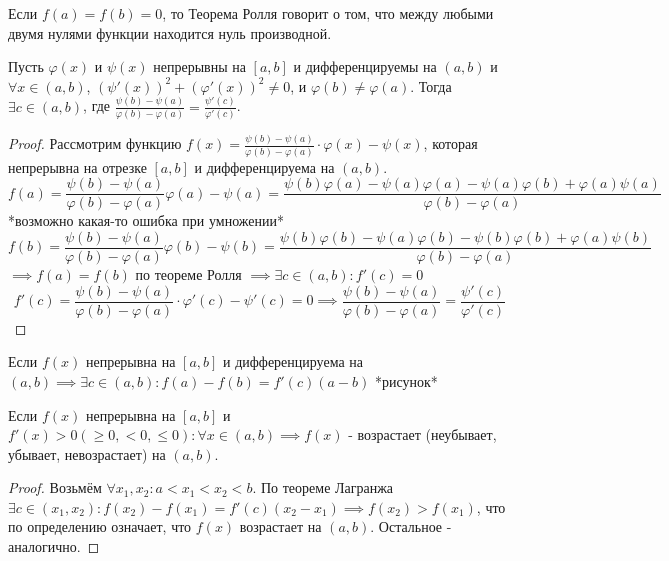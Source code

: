     Если $f(a) = f(b) = 0$, то Теорема Ролля говорит о том, что между любыми двумя нулями функции находится нуль производной.
\begin{theorem}
        Пусть $\varphi(x)$ и $\psi(x)$ непрерывны на $[a, b]$ и дифференцируемы на $(a, b)$ и $\forall x \in (a, b)$, $(\psi'(x))^2+(\varphi'(x))^2 \neq 0$, и $\varphi(b) \neq \varphi(a)$.
        Тогда $\exists c \in (a, b)$, где $\frac{\psi(b) - \psi(a)}{\varphi(b) - \varphi(a)} = \frac{\psi'(c)}{\varphi'(c)}$.
\end{theorem}
\begin{proof}
        Рассмотрим функцию $f(x) = \frac{\psi(b) - \psi(a)}{\varphi(b) - \varphi(a)} \cdot \varphi(x) - \psi(x)$, которая непрерывна на отрезке $[a, b]$ и дифференцируема на $(a, b)$.
        \[f(a)=\frac{\psi(b) - \psi(a)}{\varphi(b) - \varphi(a)}\varphi(a)-\psi(a) = \frac{\psi(b)\varphi(a)-\psi(a)\varphi(a)-\psi(a)\varphi(b)+\varphi(a)\psi(a)}{\varphi(b) - \varphi(a)}\] *возможно какая-то ошибка при умножении*
        \[f(b)=\frac{\psi(b) - \psi(a)}{\varphi(b) - \varphi(a)}\varphi(b)-\psi(b) = \frac{\psi(b)\varphi(b)-\psi(a)\varphi(b)-\psi(b)\varphi(b)+\varphi(a)\psi(b)}{\varphi(b) - \varphi(a)}\]
        $\implies f(a)=f(b)$ по теореме Ролля $\implies \exists c \in (a, b): f'(c) = 0$
        \[f'(c) = \frac{\psi(b)-\psi(a)}{\varphi(b)-\varphi(a)} \cdot \varphi'(c)-\psi'(c) = 0 \implies \frac{\psi(b)-\psi(a)}{\varphi(b)-\varphi(a)} = \frac{\psi'(c)}{\varphi'(c)}\]
\end{proof}

\begin{theorem}
        Если $f(x)$ непрерывна на $[a, b]$ и дифференцируема на $(a, b) \implies \exists c \in (a, b): f(a)-f(b)=f'(c)(a-b)$ *рисунок*
\end{theorem}

\begin{theorem}
    Если $f(x)$ непрерывна на $[a, b]$ и $f'(x)>0 (\geq 0, <0, \leq 0): \forall x \in (a, b) \implies f(x)$ - возрастает (неубывает, убывает, невозрастает) на $(a, b)$.
\end{theorem}
\begin{proof}
    Возьмём $\forall x_1, x_2: a < x_1 < x_2 < b$. По теореме Лагранжа $\exists c \in (x_1, x_2): f(x_2) - f(x_1) = f'(c)(x_2-x_1) \implies f(x_2) > f(x_1)$, что по определению означает, что $f(x)$ возрастает на $(a, b)$. Остальное - аналогично. 
\end{proof}


